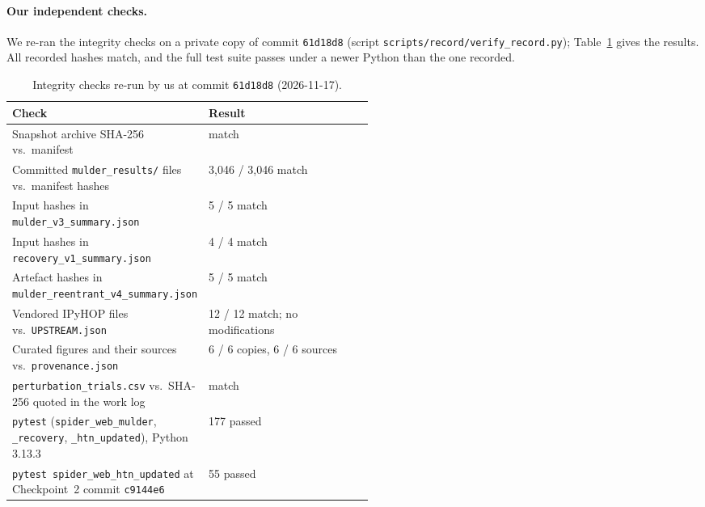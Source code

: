 \paragraph{Our independent checks.}
We re-ran the integrity checks on a private copy of commit \texttt{61d18d8} (script
\texttt{scripts/\allowbreak{}record/\allowbreak{}verify\_\allowbreak{}record.py}); Table~\ref{tab:record-integrity} gives the results. All recorded hashes
match, and the full test suite passes under a newer Python than the one recorded.

\begin{table}[t]
  \centering
  \small
  \caption{Integrity checks re-run by us at commit \texttt{61d18d8} (2026-11-17).}
  \label{tab:record-integrity}
  \begin{tabular}{@{}p{0.52\linewidth}l@{}}
    \toprule
    Check & Result \\
    \midrule
    Snapshot archive SHA-256 vs.\ manifest & match \\
    Committed \texttt{mulder\_results/} files vs.\ manifest hashes & 3,046 / 3,046 match \\
    Input hashes in \texttt{mulder\_\allowbreak{}v3\_\allowbreak{}summary.json} & 5 / 5 match \\
    Input hashes in \texttt{recovery\_\allowbreak{}v1\_\allowbreak{}summary.json} & 4 / 4 match \\
    Artefact hashes in \texttt{mulder\_\allowbreak{}reentrant\_\allowbreak{}v4\_\allowbreak{}summary.json} & 5 / 5 match \\
    Vendored IPyHOP files vs.\ \texttt{UPSTREAM.json} & 12 / 12 match; no modifications \\
    Curated figures and their sources vs.\ \texttt{provenance.json} & 6 / 6 copies, 6 / 6 sources \\
    \texttt{perturbation\_\allowbreak{}trials.csv} vs.\ SHA-256 quoted in the work log & match \\
    \texttt{pytest} (\texttt{spider\_\allowbreak{}web\_\allowbreak{}mulder}, \texttt{\_recovery}, \texttt{\_htn\_updated}), Python 3.13.3 &
      177 passed \\
    \texttt{pytest spider\_\allowbreak{}web\_\allowbreak{}htn\_\allowbreak{}updated} at Checkpoint~2 commit \texttt{c9144e6} & 55 passed \\
    \bottomrule
  \end{tabular}
\end{table}


